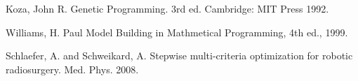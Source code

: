 \documentclass[USenglish,twocolumn]{article}
\begin{document}
\begin{thebibliography}{9}



Koza, John R. Genetic Programming. 3rd ed. Cambridge: MIT Press 1992.

Williams, H. Paul Model Building in Mathmetical Programming, 4th ed., 1999.

Schlaefer, A. and Schweikard, A. Stepwise multi-criteria optimization for robotic radiosurgery. Med. Phys. 2008.



\end{thebibliography}
\end{document}
